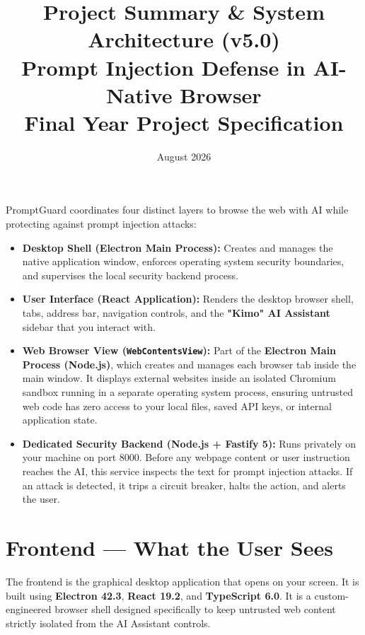 \documentclass[11pt,a4paper]{article}
\title{\textbf{\LARGE Project Summary \& System Architecture (v5.0)}\\[0.3em]
\Large Prompt Injection Defense in AI-Native Browser\\[0.2em]
\large Final Year Project Specification}
\author{August 2026}
\date{}
\begin{document}
\maketitle

\begin{tcolorbox}[title=System Overview: How PromptGuard Works]
PromptGuard coordinates four distinct layers to browse the web with AI while protecting against prompt injection attacks:
\begin{itemize}[leftmargin=1.2em, itemsep=2pt]
\item \textbf{Desktop Shell (Electron Main Process):} Creates and manages the native application window, enforces operating system security boundaries, and supervises the local security backend process.
\item \textbf{User Interface (React Application):} Renders the desktop browser shell, tabs, address bar, navigation controls, and the \textbf{"Kimo" AI Assistant} sidebar that you interact with.
\item \textbf{Web Browser View (\texttt{WebContentsView}):} Part of the \textbf{Electron Main Process (Node.js)}, which creates and manages each browser tab inside the main window. It displays external websites inside an isolated Chromium sandbox running in a separate operating system process, ensuring untrusted web code has zero access to your local files, saved API keys, or internal application state.
\item \textbf{Dedicated Security Backend (Node.js + Fastify 5):} Runs privately on your machine on port 8000. Before any webpage content or user instruction reaches the AI, this service inspects the text for prompt injection attacks. If an attack is detected, it trips a circuit breaker, halts the action, and alerts the user.
\end{itemize}
\end{tcolorbox}

\vspace{0.8em}
\tableofcontents
\newpage

\section{Frontend --- What the User Sees}

The frontend is the graphical desktop application that opens on your screen. It is built using \textbf{Electron 42.3}, \textbf{React 19.2}, and \textbf{TypeScript 6.0}. It is a custom-engineered browser shell designed specifically to keep untrusted web content strictly isolated from the AI Assistant controls.
\end{document}
